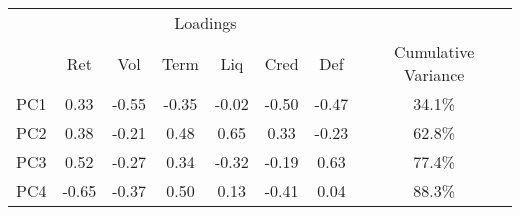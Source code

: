 \begingroup
\fontsize{12.0pt}{14.4pt}\selectfont
\begin{tabular}{lccccccc}
\toprule
 & \multicolumn{6}{c}{Loadings} &  \\ 
\cmidrule(lr){2-7}
 & Ret & Vol & Term & Liq & Cred & Def & Cumulative Variance \\ 
\midrule\addlinespace[2.5pt]
PC1 & 0.33 & -0.55 & -0.35 & -0.02 & -0.50 & -0.47 & 34.1\% \\ 
PC2 & 0.38 & -0.21 & 0.48 & 0.65 & 0.33 & -0.23 & 62.8\% \\ 
PC3 & 0.52 & -0.27 & 0.34 & -0.32 & -0.19 & 0.63 & 77.4\% \\ 
PC4 & -0.65 & -0.37 & 0.50 & 0.13 & -0.41 & 0.04 & 88.3\% \\ 
\bottomrule
\end{tabular}
\endgroup

